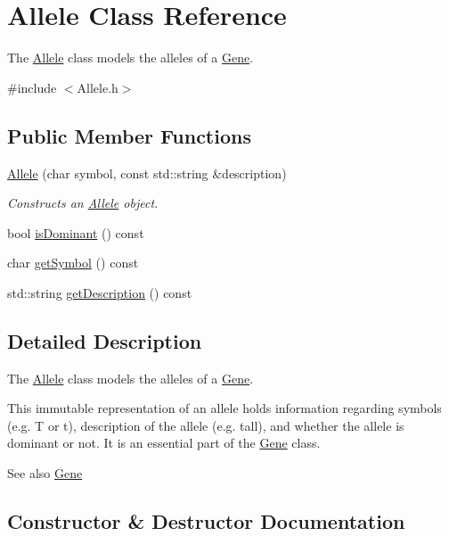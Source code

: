 \hypertarget{class_allele}{}\section{Allele Class Reference}
\label{class_allele}


The \hyperlink{class_allele}{Allele} class models the alleles of a \hyperlink{class_gene}{Gene}.  




{\ttfamily \#include $<$Allele.\+h$>$}

\subsection*{Public Member Functions}
\begin{DoxyCompactItemize}
\item 
\hyperlink{class_allele_a22adf689d715473f8a14fdc2ac80e167}{Allele} (char symbol, const std\+::string \&description)
\begin{DoxyCompactList}\small\item\em Constructs an \hyperlink{class_allele}{Allele} object. \end{DoxyCompactList}\item 
bool \hyperlink{class_allele_a6096e43a00dfc291544abd97b4a82c06}{is\+Dominant} () const 
\item 
char \hyperlink{class_allele_afc738a4cfcc3e69e07baf2e196570c0a}{get\+Symbol} () const 
\item 
std\+::string \hyperlink{class_allele_a332bec024b1be3eff4ba984320aed490}{get\+Description} () const 
\end{DoxyCompactItemize}


\subsection{Detailed Description}
The \hyperlink{class_allele}{Allele} class models the alleles of a \hyperlink{class_gene}{Gene}. 

This immutable representation of an allele holds information regarding symbols (e.\+g. T or t), description of the allele (e.\+g. tall), and whether the allele is dominant or not. It is an essential part of the \hyperlink{class_gene}{Gene} class. \begin{DoxySeeAlso}{See also}
\hyperlink{class_gene}{Gene} 
\end{DoxySeeAlso}


\subsection{Constructor \& Destructor Documentation}
\hypertarget{class_allele_a22adf689d715473f8a14fdc2ac80e167}{}
